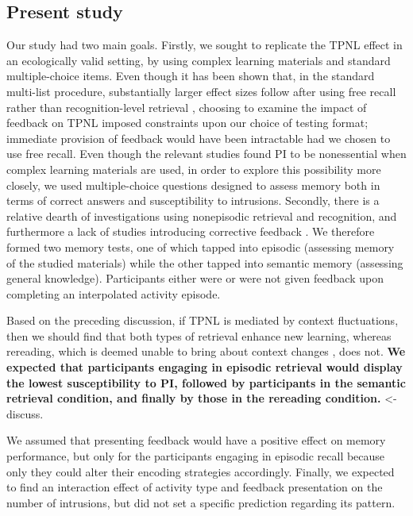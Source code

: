 \documentclass[../main.tex]{subfiles}
\begin{document}
\subsection{Present study\label{present}}

Our study had two main goals. Firstly, we sought to replicate the TPNL 
effect in an ecologically valid setting, by using complex learning materials 
and standard multiple-choice items. Even though it has been shown that, in 
the standard multi-list procedure, substantially larger effect sizes follow 
after using free recall rather than recognition-level retrieval 
 \citep{chanRetrievalPotentiatesNew2018}, choosing to examine the impact of 
feedback on TPNL imposed constraints upon our choice of testing format; 
immediate provision of feedback would have been intractable had we chosen 
to use free recall. Even though the relevant studies found PI to be 
nonessential when complex learning materials are used, in order to explore 
this possibility more closely, we used multiple-choice questions designed to 
assess memory both in terms of correct answers and susceptibility to 
intrusions. Secondly, there is a relative dearth of investigations using 
nonepisodic retrieval and recognition, and furthermore a lack of studies 
introducing corrective feedback \citep{chanRetrievalPotentiatesNew2018}. We 
therefore formed two memory tests, one of which tapped into episodic 
(assessing memory of the studied materials) while the other tapped into 
semantic memory (assessing general knowledge). Participants either were or 
were not given feedback upon completing an interpolated activity episode.

Based on the preceding discussion, if TPNL is mediated by context 
fluctuations, then we should find that both types of retrieval enhance new 
learning, whereas rereading, which is deemed unable to bring about context 
changes \citep{chanRetrievalPotentiatesNew2018}, does not. \textbf{We 
expected that participants engaging in episodic retrieval would display the 
lowest susceptibility to PI, followed by participants in the semantic 
retrieval condition, and finally by those in the rereading condition.} <- 
discuss.

We assumed that 
presenting feedback would have a positive effect on memory performance, but 
only for the participants engaging in episodic recall because only they 
could alter their encoding strategies accordingly. Finally, we expected to 
find an interaction effect of activity type and feedback presentation on the 
number of intrusions, but did not set a specific prediction regarding its 
pattern.
 
{
	\biblio
}
\end{document}
